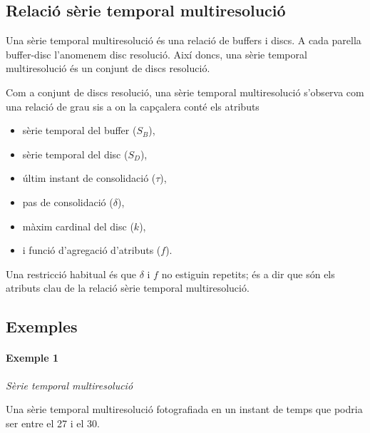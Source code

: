 \subsection{Relació sèrie temporal multiresolució}



Una sèrie temporal multiresolució és una relació de buffers i discs. A
cada parella buffer-disc l'anomenem disc resolució. Així doncs, una
sèrie temporal multiresolució és un conjunt de discs resolució.

Com a conjunt de discs resolució, una sèrie temporal multiresolució
s'observa com una relació de grau sis a on la capçalera conté els
atributs
\begin{itemize}
\item sèrie temporal del buffer ($S_B$),
\item sèrie temporal del disc ($S_D$),
\item últim instant de consolidació ($\tau$),
\item pas de consolidació ($\delta$),
\item màxim cardinal del disc ($k$),
\item i funció d'agregació d'atributs ($f$).
\end{itemize}

Una restricció habitual és que $\delta$ i $f$ no estiguin repetits; és
a dir que són els atributs clau de la relació sèrie temporal multiresolució.





\subsection{Exemples}

\paragraph{Exemple 1} \emph{Sèrie temporal multiresolució}

Una sèrie temporal multiresolució fotografiada en un instant de temps que podria
ser entre el 27 i el 30.



